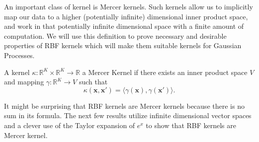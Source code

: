 An important class of kernel is Mercer kernels.
Such kernels allow us to implicitly map our data to a higher (potentially infinite) dimensional inner product space, and work in that potentially infinite dimensional space with a finite amount of computation.
We will use this definition to prove necessary and desirable properties of RBF kernels which will make them suitable kernels for Gaussian Processes.

\begin{definition}
    A kernel $\kappa: \mathbb{R}^{K} \times \mathbb{R}^{K} \to \mathbb{R}$
    a Mercer Kernel if there exists an inner product space
    $V$ and mapping $\gamma : \mathbb{R}^{K} \to V$ such that
    \begin{equation*}
        \kappa(\mathbf{x}, \mathbf{x}') = \langle \gamma(\mathbf{x}), \gamma(\mathbf{x}') \rangle.
    \end{equation*}
\end{definition}

It might be surprising that RBF kernels are Mercer kernels because there is no sum in its formula.
The next few results utilize infinite dimensional vector spaces and a clever use of the Taylor expansion of $e^{x}$ to show that RBF kernels are Mercer kernel.

